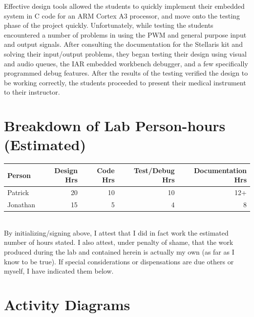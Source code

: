 \documentclass[12pt]{article} %
\begin{document}
    Effective design tools allowed the students to quickly implement their embedded
    system in C code for an ARM Cortex A3 processor, and move onto the testing
    phase of the project quickly. Unfortunately, while testing the students
    encountered a number of problems in using the PWM and general purpose input and
    output signals. After consulting the documentation for the Stellaris kit and
    solving their input/output problems, they began testing their design using
    visual and audio queues, the IAR embedded workbench debugger, and a few
    specifically programmed debug features. After the results of the testing
    verified the design to be working correctly, the students proceeded to present
    their medical instrument to their instructor.

    \pagebreak
    \appendix

    \section{Breakdown of Lab Person-hours (Estimated)}

    \begin{tabular}{|l|*{4}{r|}}
      \hline
      Person & Design Hrs & Code Hrs & Test/Debug Hrs & Documentation Hrs \\ \hline
      Patrick & 20 & 10 & 10 & 12+  \\ \hline
      Jonathan & 15 & 5 & 4 & 8  \\ \hline
    \end{tabular}

    ~\\

    By initializing/signing above, I attest that I did in fact work the
    estimated number of hours stated. I also attest, under penalty of shame,
    that the work produced during the lab and contained herein is actually my
    own (as far as I know to be true). If special considerations or
    dispensations are due others or myself, I have indicated them below.

    \pagebreak

    \section{Activity Diagrams}
\end{document}
